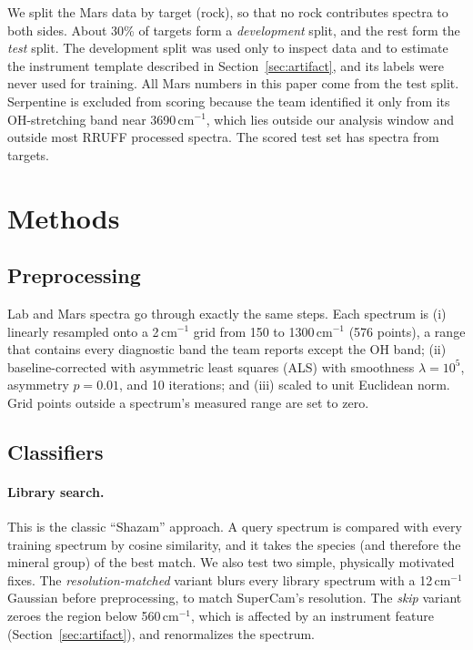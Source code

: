 We split the Mars data by target (rock), so that no rock contributes spectra to both sides. About 30\% of targets form a \emph{development} split, and the rest form the \emph{test} split. The development split was used only to inspect data and to estimate the instrument template described in Section~\ref{sec:artifact}, and its labels were never used for training. All Mars numbers in this paper come from the test split. Serpentine is excluded from scoring because the team identified it only from its OH-stretching band near 3690\,cm$^{-1}$, which lies outside our analysis window and outside most RRUFF processed spectra. The scored test set has \nMarsEval{} spectra from \nMarsTargets{} targets.

\begin{table}[!htbp]
\centering
\caption{SuperCam Raman observations with team mineral identifications, by primary mineral group. The test split is used for every Mars result. Serpentine is excluded from scoring (see text).}
\label{tab:mars}
\small

\end{table}

\section{Methods}
\label{sec:methods}

\subsection{Preprocessing}
Lab and Mars spectra go through exactly the same steps. Each spectrum is (i) linearly resampled onto a 2\,cm$^{-1}$ grid from 150 to 1300\,cm$^{-1}$ (576 points), a range that contains every diagnostic band the team reports except the OH band; (ii) baseline-corrected with asymmetric least squares (ALS) \citep{eilers2005baseline} with smoothness $\lambda=10^5$, asymmetry $p=0.01$, and 10 iterations; and (iii) scaled to unit Euclidean norm. Grid points outside a spectrum's measured range are set to zero.

\subsection{Classifiers}
\paragraph{Library search.} This is the classic ``Shazam'' approach. A query spectrum is compared with every training spectrum by cosine similarity, and it takes the species (and therefore the mineral group) of the best match. We also test two simple, physically motivated fixes. The \emph{resolution-matched} variant blurs every library spectrum with a 12\,cm$^{-1}$ Gaussian before preprocessing, to match SuperCam's resolution. The \emph{skip} variant zeroes the region below 560\,cm$^{-1}$, which is affected by an instrument feature (Section~\ref{sec:artifact}), and renormalizes the spectrum.

